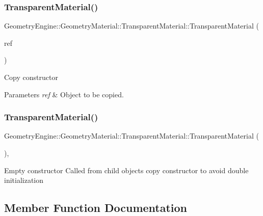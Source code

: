 \subsubsection{\texorpdfstring{TransparentMaterial()}{TransparentMaterial()}\hspace{0.1cm}{\footnotesize\ttfamily [2/3]}}
{\footnotesize\ttfamily Geometry\+Engine\+::\+Geometry\+Material\+::\+Transparent\+Material\+::\+Transparent\+Material (\begin{DoxyParamCaption}\item[{const \mbox{\hyperlink{class_geometry_engine_1_1_geometry_material_1_1_transparent_material}{Transparent\+Material}} \&}]{ref }\end{DoxyParamCaption})}

Copy constructor 
\begin{DoxyParams}{Parameters}
{\em ref} & Object to be copied. \\
\hline
\end{DoxyParams}
\mbox{\label{class_geometry_engine_1_1_geometry_material_1_1_transparent_material_ac27f7c3f5604b030abbbfc21cbe31890}} 
\subsubsection{\texorpdfstring{TransparentMaterial()}{TransparentMaterial()}\hspace{0.1cm}{\footnotesize\ttfamily [3/3]}}
{\footnotesize\ttfamily Geometry\+Engine\+::\+Geometry\+Material\+::\+Transparent\+Material\+::\+Transparent\+Material (\begin{DoxyParamCaption}{ }\end{DoxyParamCaption})\hspace{0.3cm}{\ttfamily [inline]}, {\ttfamily [protected]}}

Empty constructor Called from child objects copy constructor to avoid double initialization 

\subsection{Member Function Documentation}
\mbox{\label{class_geometry_engine_1_1_geometry_material_1_1_transparent_material_a89eaec3ce50fbca5e56edcbe3f3cde6f}} 
